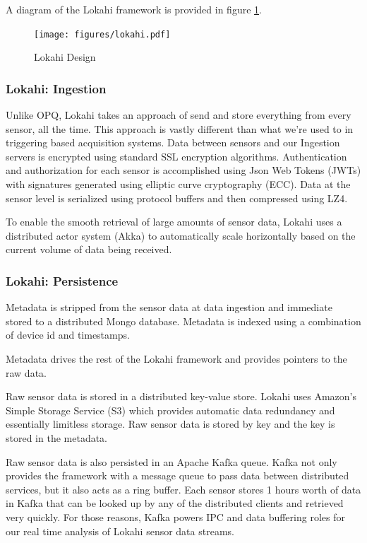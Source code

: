 A diagram of the Lokahi framework is provided in figure \ref{fig:lokahi}.


\begin{figure}
	\centering
	\texttt{[image: figures/lokahi.pdf]}
	\caption{Lokahi Design}\label{fig:lokahi}
\end{figure}

\subsubsection{Lokahi: Ingestion}
Unlike OPQ, Lokahi takes an approach of send and store everything from every sensor, all the time. This approach is vastly different than what we're used to in triggering based acquisition systems. Data between sensors and our Ingestion servers is encrypted using standard SSL encryption algorithms. Authentication and authorization for each sensor is accomplished using Json Web Tokens (JWTs) with signatures generated using elliptic curve cryptography (ECC). Data at the sensor level is serialized using protocol buffers and then compressed using LZ4. 

To enable the smooth retrieval of large amounts of sensor data, Lokahi uses a distributed actor system (Akka) to automatically scale horizontally based on the current volume of data being received. 

\subsubsection{Lokahi: Persistence}
Metadata is stripped from the sensor data at data ingestion and immediate stored to a distributed Mongo database. Metadata is indexed using a combination of device id and timestamps. 

Metadata drives the rest of the Lokahi framework and provides pointers to the raw data.

Raw sensor data is stored in a distributed key-value store. Lokahi uses Amazon's Simple Storage Service (S3) which provides automatic data redundancy and essentially limitless storage. Raw sensor data is stored by key and the key is stored in the metadata.

Raw sensor data is also persisted in an Apache Kafka queue. Kafka not only provides the framework with a message queue to pass data between distributed services, but it also acts as a ring buffer. Each sensor stores 1 hours worth of data in Kafka that can be looked up by any of the distributed clients and retrieved very quickly. For those reasons, Kafka powers IPC and data buffering roles for our real time analysis of Lokahi sensor data streams.  


